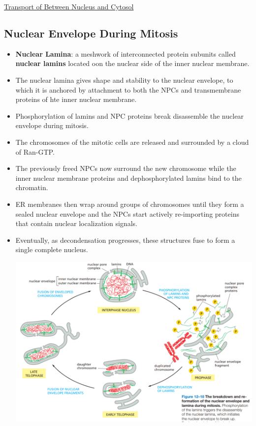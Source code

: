 \documentclass[12pt,letterpaper]{article}
\begin{document}
\begin{secbox}{\hyperlink{12}{Transport of Between Nucleus and Cytosol}}
{    
    \hypertarget{12.2.6}{\subsection*{Nuclear Envelope During Mitosis}}
    \begin{itemize}
        \item \textbf{Nuclear Lamina}: a meshwork of interconnected protein subunits called \textbf{nuclear lamins} located oon the nuclear side of the inner nuclear membrane.
        \item The nuclear lamina gives shape and stability to the nuclear envelope, to which it is anchored by attachment to both the NPCs and transmembrane proteins of hte inner nuclear membrane.
        \item Phosphorylation of lamins and NPC proteins break disassemble the nuclear envelope during mitosis.
        \item The chromosomes of the mitotic cells are released and surrounded by a cloud of Ran-GTP. 
        \item The previously freed NPCs now surround the new chromosome while the inner nuclear membrane proteins and dephosphorylated lamins bind to the chromatin.
        \item ER membranes then wrap around groups of chromosomes until they form a sealed nuclear envelope and the NPCs start actively re-importing proteins that contain nuclear localization signals.
        \item Eventually, as decondensation progresses, these  structures fuse to form a single complete nucleus.\par
        \includegraphics[width=\linewidth]{images/fig12-18.png}
    \end{itemize}
    
}
\end{secbox}
\end{document}
